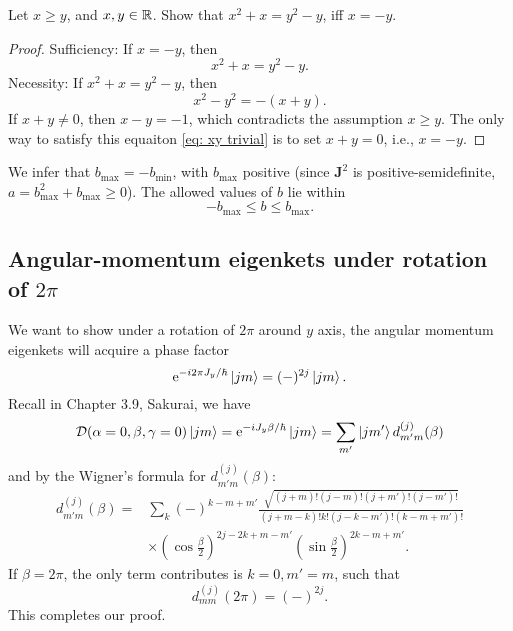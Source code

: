 \documentclass[10pt]{article}
\begin{document}
	\begin{proposition}
		Let $x \ge y$, and $x, y \in {\mathbb{R}}$. Show that $x^2 + x = y^2 - y$, iff $x = -y$.
	\end{proposition}
	\begin{proof}
		Sufficiency: If $x = -y$, then
		\begin{equation}
			x^2 + x = y^2 - y.
		\end{equation}
		Necessity: If $x^2 + x = y^2 - y$, then
		\begin{equation}
			x^2 - y^2 = -(x + y). \label{eq: xy trivial}
		\end{equation}
		If $x+y \neq 0$, then $x - y = -1$, which contradicts the assumption $x \ge y$. The only way to satisfy this equaiton \eqref{eq: xy trivial} is to set $x + y = 0$, i.e., $x = -y$.
	\end{proof}
	We infer that $b_{\max} = -b_{\min}$, with $b_{\max}$ positive (since $\mathbf{J}^2$ is positive-semidefinite, $a = b_{\max}^2 + b_{\max} \ge 0$). The allowed values of $b$ lie within
	\begin{equation}
		-b_{\max} \le b \le b_{\max}.
	\end{equation}

	\subsection{Angular-momentum eigenkets under rotation of $2\pi$}

	We want to show under a rotation of $2\pi$ around $y$ axis, the angular momentum eigenkets will acquire a phase factor
	\begin{equation}
		{\mathrm{e}}^{-i 2\pi J_y / \hbar}\ket{jm} = (-)^{2j}\ket{jm}.
	\end{equation}
	Recall in Chapter 3.9, Sakurai, we have
	\begin{equation}
		\mathcal{D}(\alpha = 0, \beta, \gamma = 0) \ket{jm} = {\mathrm{e}}^{-i J_y \beta / \hbar}\ket{jm} = \sum_{m'} \ket{jm'} d^{(j)}_{m'm}(\beta)
	\end{equation}
	and by the Wigner's formula for $d^{(j)}_{m'm}(\beta)$:
	\begin{align*}
		d^{(j)}_{m'm}(\beta) =& \sum_{k}(-)^{k-m+m'} \frac{\sqrt{(j+m)!(j-m)!(j+m')!(j-m')!}}{(j+m-k)!k!(j-k-m')!(k-m+m')!} \\
		& \times (\cos{\frac{\beta}{2}})^{2j-2k+m-m'} (\sin{\frac{\beta}{2}})^{2k-m+m'}.
	\end{align*}
	If $\beta = 2\pi$, the only term contributes is $k=0, m'=m$, such that
	\begin{equation}
		d^{(j)}_{mm}(2 \pi) = (-)^{2j}.
	\end{equation}
	This completes our proof.
\end{document}
